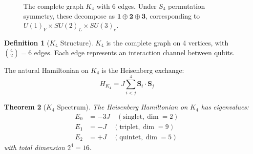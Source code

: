 \documentclass[11pt,a4paper]{article}
\newtheorem{theorem}{Theorem}[section]
\theoremstyle{definition}
\newtheorem{definition}[theorem]{Definition}
\begin{document}
\begin{figure}[h]
\centering
{}
\caption{The complete graph $K_4$ with 6 edges. Under $S_4$ permutation symmetry, these decompose as $\mathbf{1} \oplus \mathbf{2} \oplus \mathbf{3}$, corresponding to $U(1)_Y \times SU(2)_L \times SU(3)_c$.}
\label{fig:K4}
\end{figure}

\begin{definition}[$K_4$ Structure]
$K_4$ is the complete graph on 4 vertices, with $\binom{4}{2} = 6$ edges. Each edge represents an interaction channel between qubits.
\end{definition}

The natural Hamiltonian on $K_4$ is the Heisenberg exchange:
\begin{equation}
H_{K_4} = J \sum_{i<j}^{4} \mathbf{S}_i \cdot \mathbf{S}_j
\label{eq:HK4}
\end{equation}

\begin{theorem}[$K_4$ Spectrum]
The Heisenberg Hamiltonian on $K_4$ has eigenvalues:
\begin{align}
E_0 &= -3J \quad (\text{singlet}, \dim=2) \\
E_1 &= -J \quad (\text{triplet}, \dim=9) \\
E_2 &= +J \quad (\text{quintet}, \dim=5)
\end{align}
with total dimension $2^4 = 16$.
\end{theorem}
\end{document}
